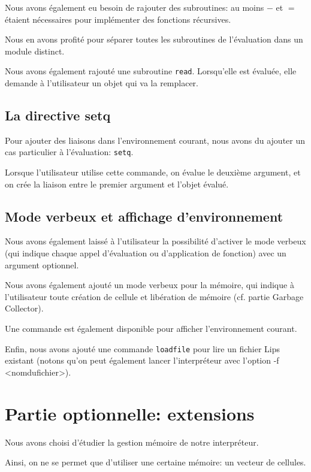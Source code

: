 \documentclass[12pt]{article}
\def\code #1{\lstinline{#1}}
\begin{document}
Nous avons également eu besoin de rajouter des subroutines: au moins $-$ et $=$ étaient nécessaires pour implémenter des fonctions récursives.

Nous en avons profité pour séparer toutes les subroutines de l'évaluation dans un module distinct.

Nous avons également rajouté une subroutine \code{read}. Lorsqu'elle est évaluée, elle demande à l'utilisateur un objet qui va la remplacer.

\subsection{La directive setq}

Pour ajouter des liaisons dans l'environnement courant, nous avons du ajouter un cas particulier à l'évaluation: \code{setq}. 

Lorsque l'utilisateur utilise cette commande, on évalue le deuxième argument, et on crée la liaison entre le premier argument et l'objet évalué.


\subsection{Mode verbeux et affichage d'environnement}

Nous avons également laissé à l'utilisateur la possibilité d'activer le mode verbeux (qui indique chaque appel d'évaluation ou d'application de fonction) avec un argument optionnel.

Nous avons également ajouté un mode verbeux pour la mémoire, qui indique à l'utilisateur toute création de cellule et libération de mémoire (cf. partie Garbage Collector).

Une commande est également disponible pour afficher l'environnement courant.

Enfin, nous avons ajouté une commande \code{loadfile} pour lire un fichier Lips existant (notons qu'on peut également lancer l'interpréteur avec l'option -f <nomdufichier>).


\section{Partie optionnelle: extensions}

Nous avons choisi d'étudier la gestion mémoire de notre interpréteur.

Ainsi, on ne se permet que d'utiliser une certaine mémoire: un vecteur de cellules.
\end{document}
